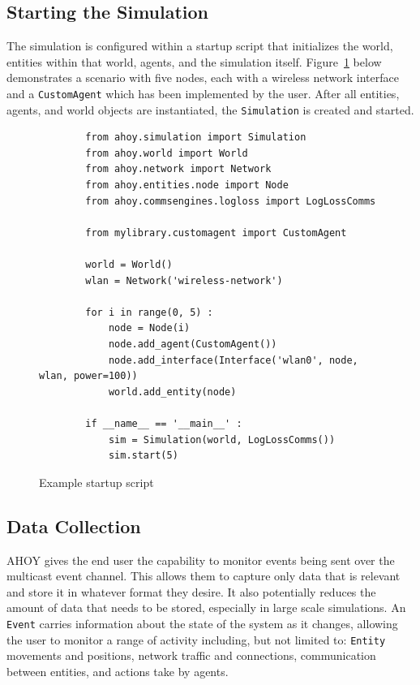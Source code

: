 \documentclass[titlepage]{article}
\begin{document}
\subsection{Starting the Simulation}
The simulation is configured within a startup script that initializes the world, entities within that world, agents, and the simulation itself.  Figure~\ref{fig:exstartup} below demonstrates a scenario with five nodes, each with a wireless network interface and a \texttt{CustomAgent} which has been implemented by the user.  After all entities, agents, and world objects are instantiated, the \texttt{Simulation} is created and started.
\begin{figure}
    \begin{verbatim}
        from ahoy.simulation import Simulation
        from ahoy.world import World
        from ahoy.network import Network
        from ahoy.entities.node import Node
        from ahoy.commsengines.logloss import LogLossComms

        from mylibrary.customagent import CustomAgent

        world = World()
        wlan = Network('wireless-network')

        for i in range(0, 5) :
            node = Node(i)
            node.add_agent(CustomAgent())
            node.add_interface(Interface('wlan0', node, wlan, power=100))
            world.add_entity(node)

        if __name__ == '__main__' :
            sim = Simulation(world, LogLossComms())
            sim.start(5)
    \end{verbatim}
    \caption{Example startup script}
    \label{fig:exstartup}
\end{figure}


\pagebreak

\subsection{Data Collection}
\label{sec:data_collection}
AHOY gives the end user the capability to monitor events being sent over the multicast event channel.  This allows them to capture only data that is relevant and store it in whatever format they desire.  It also potentially reduces the amount of data that needs to be stored, especially in large scale simulations.  An \texttt{Event} carries information about the state of the system as it changes, allowing the user to monitor a range of activity including, but not limited to: \texttt{Entity} movements and positions, network traffic and connections, communication between entities, and actions take by agents.  
\end{document}
